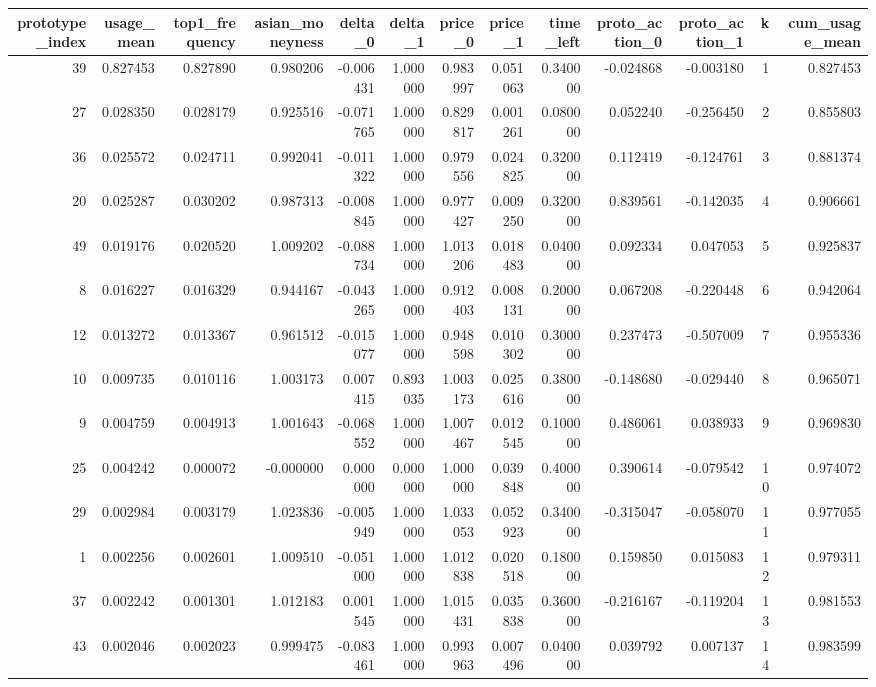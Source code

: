 \begin{tabular}{rrrrrrrrrrrrr}
\toprule
prototype\_index & usage\_mean & top1\_frequency & asian\_moneyness & delta\_0 & delta\_1 & price\_0 & price\_1 & time\_left & proto\_action\_0 & proto\_action\_1 & k & cum\_usage\_mean \\
\midrule
39 & 0.827453 & 0.827890 & 0.980206 & -0.006431 & 1.000000 & 0.983997 & 0.051063 & 0.340000 & -0.024868 & -0.003180 & 1 & 0.827453 \\
27 & 0.028350 & 0.028179 & 0.925516 & -0.071765 & 1.000000 & 0.829817 & 0.001261 & 0.080000 & 0.052240 & -0.256450 & 2 & 0.855803 \\
36 & 0.025572 & 0.024711 & 0.992041 & -0.011322 & 1.000000 & 0.979556 & 0.024825 & 0.320000 & 0.112419 & -0.124761 & 3 & 0.881374 \\
20 & 0.025287 & 0.030202 & 0.987313 & -0.008845 & 1.000000 & 0.977427 & 0.009250 & 0.320000 & 0.839561 & -0.142035 & 4 & 0.906661 \\
49 & 0.019176 & 0.020520 & 1.009202 & -0.088734 & 1.000000 & 1.013206 & 0.018483 & 0.040000 & 0.092334 & 0.047053 & 5 & 0.925837 \\
8 & 0.016227 & 0.016329 & 0.944167 & -0.043265 & 1.000000 & 0.912403 & 0.008131 & 0.200000 & 0.067208 & -0.220448 & 6 & 0.942064 \\
12 & 0.013272 & 0.013367 & 0.961512 & -0.015077 & 1.000000 & 0.948598 & 0.010302 & 0.300000 & 0.237473 & -0.507009 & 7 & 0.955336 \\
10 & 0.009735 & 0.010116 & 1.003173 & 0.007415 & 0.893035 & 1.003173 & 0.025616 & 0.380000 & -0.148680 & -0.029440 & 8 & 0.965071 \\
9 & 0.004759 & 0.004913 & 1.001643 & -0.068552 & 1.000000 & 1.007467 & 0.012545 & 0.100000 & 0.486061 & 0.038933 & 9 & 0.969830 \\
25 & 0.004242 & 0.000072 & -0.000000 & 0.000000 & 0.000000 & 1.000000 & 0.039848 & 0.400000 & 0.390614 & -0.079542 & 10 & 0.974072 \\
29 & 0.002984 & 0.003179 & 1.023836 & -0.005949 & 1.000000 & 1.033053 & 0.052923 & 0.340000 & -0.315047 & -0.058070 & 11 & 0.977055 \\
1 & 0.002256 & 0.002601 & 1.009510 & -0.051000 & 1.000000 & 1.012838 & 0.020518 & 0.180000 & 0.159850 & 0.015083 & 12 & 0.979311 \\
37 & 0.002242 & 0.001301 & 1.012183 & 0.001545 & 1.000000 & 1.015431 & 0.035838 & 0.360000 & -0.216167 & -0.119204 & 13 & 0.981553 \\
43 & 0.002046 & 0.002023 & 0.999475 & -0.083461 & 1.000000 & 0.993963 & 0.007496 & 0.040000 & 0.039792 & 0.007137 & 14 & 0.983599 \\

\end{tabular}
